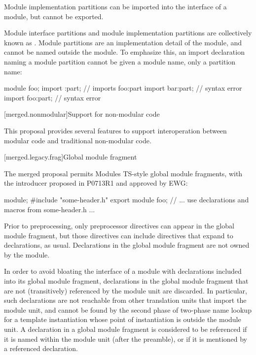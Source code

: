\pnum
Module implementation partitions can be imported
into the interface of a module,
but cannot be exported.

\pnum
Module interface partitions and module implementation partitions
are collectively known as .
Module partitions are an implementation detail of the module,
and cannot be named outside the module.
To emphasize this, an import declaration naming a module partition
cannot be given a module name, only a partition name:

\begin{codeblock}
module foo;
import :part;           // imports foo:part
import bar:part;        // syntax error
import foo:part;        // syntax error
\end{codeblock}

[merged.nonmodular]{Support for non-modular code}

\pnum
This proposal provides several features to support
interoperation between modular code
and traditional non-modular code.

[merged.legacy.frag]{Global module fragment}

\pnum
The merged proposal permits Modules TS-style global module fragments,
with the  introducer proposed in P0713R1
and approved by EWG:

\begin{codeblock}
module;
#include "some-header.h"
export module foo;
// ... use declarations and macros from some-header.h ...
\end{codeblock}

\pnum
Prior to preprocessing, only preprocessor directives can appear
in the global module fragment, but those directives can include
 directives that expand to declarations, as usual.
Declarations in the global module fragment
are not owned by the module.

\pnum
In order to avoid bloating the interface of a module with declarations
included into its global module fragment, declarations in the global
module fragment that are not (transitively) referenced by the module unit are
discarded.
In particular, such declarations are not reachable from other translation
units that import the module unit, and cannot be found by the second phase
of two-phase name lookup for a template instantiation whose point of
instantiation is outside the module unit.
A declaration in a global module fragment is considered to be referenced if it
is named within the module unit (after the preamble), or if it is mentioned
by a referenced declaration.

